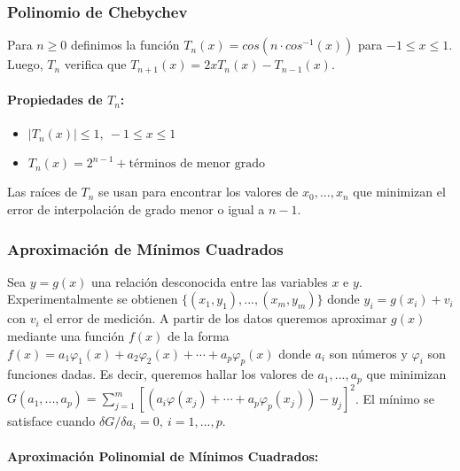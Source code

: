 \hypertarget{polinomio-de-chebychev}{%
\subsubsection{Polinomio de Chebychev}\label{polinomio-de-chebychev}}

Para \(n \geq 0\) definimos la función
\(T_n(x) = cos(n \cdot cos^{-1}(x))\) para \(-1 \leq x \leq 1\). Luego,
\(T_n\) verifica que \(T_{n+1}(x) = 2 x T_n(x) - T_{n-1}(x)\).

\hypertarget{propiedades-de-t_n}{%
\paragraph{\texorpdfstring{Propiedades de
\(T_n\):}{Propiedades de T\_n:}}\label{propiedades-de-t_n}}

\begin{itemize}
\tightlist
\item
  \(|T_n(x)| \leq 1,\  -1 \leq x \leq 1\)
\item
  \(T_n(x) = 2^{n-1} + \text{términos de menor grado}\)
\end{itemize}

Las raíces de \(T_n\) se usan para encontrar los valores de
\(x_0, ..., x_n\) que minimizan el error de interpolación de grado menor
o igual a \(n-1\).

\hypertarget{aproximaciuxf3n-de-muxednimos-cuadrados}{%
\subsubsection{Aproximación de Mínimos
Cuadrados}\label{aproximaciuxf3n-de-muxednimos-cuadrados}}

Sea \(y = g(x)\) una relación desconocida entre las variables \(x\) e
\(y\). Experimentalmente se obtienen \(\{(x_1, y_1), ..., (x_m, y_m)\}\)
donde \(y_i = g(x_i) + v_i\) con \(v_i\) el error de medición. A partir
de los datos queremos aproximar \(g(x)\) mediante una función \(f(x)\)
de la forma
\(f(x) = a_1 \varphi_1(x) + a_2 \varphi_2(x) + \cdots + a_p \varphi_p(x)\)
donde \(a_i\) son números y \(\varphi_i\) son funciones dadas. Es decir,
queremos hallar los valores de \(a_1,..., a_p\) que minimizan
\(G(a_1, ..., a_p) = \sum_{j=1}^m [(a_i \varphi(x_j) + \cdots + a_p \varphi_p(x_j)) - y_j]^2\).
El mínimo se satisface cuando
\(\delta G / \delta a_i = 0,\  i=1,...,p\).

\hypertarget{aproximaciuxf3n-polinomial-de-muxednimos-cuadrados}{%
\paragraph{Aproximación Polinomial de Mínimos
Cuadrados:}\label{aproximaciuxf3n-polinomial-de-muxednimos-cuadrados}}

